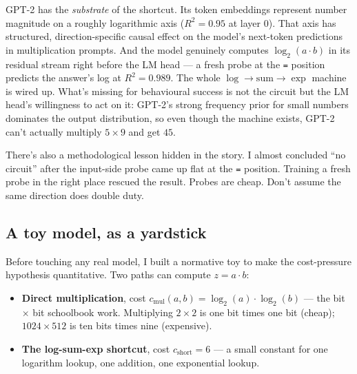 \documentclass[
]{article}
\providecommand{\tightlist}{%
  \setlength{\itemsep}{0pt}\setlength{\parskip}{0pt}}
\begin{document}
\begin{tcolorbox}[enhanced jigsaw, arc=.35mm, bottomrule=.15mm, bottomtitle=1mm, breakable, colback=white, colbacktitle=quarto-callout-note-color!10!white, colframe=quarto-callout-note-color-frame, coltitle=black, left=2mm, leftrule=.75mm, opacityback=0, opacitybacktitle=0.6, rightrule=.15mm, title=\textcolor{quarto-callout-note-color}{\faInfo}\hspace{0.5em}{Summary}, titlerule=0mm, toprule=.15mm, toptitle=1mm]

GPT-2 has the \emph{substrate} of the shortcut. Its token embeddings
represent number magnitude on a roughly logarithmic axis (\(R^2 = 0.95\)
at layer 0). That axis has structured, direction-specific causal effect
on the model's next-token predictions in multiplication prompts. And the
model genuinely computes \(\log_2(a \cdot b)\) in its residual stream
right before the LM head --- a fresh probe at the \texttt{=} position
predicts the answer's log at \(R^2 = 0.989\). The whole
\(\log \to \mathrm{sum} \to \exp\) machine is wired up. What's missing
for behavioural success is not the circuit but the LM head's willingness
to act on it: GPT-2's strong frequency prior for small numbers dominates
the output distribution, so even though the machine exists, GPT-2 can't
actually multiply \(5 \times 9\) and get \(45\).

\end{tcolorbox}

There's also a methodological lesson hidden in the story. I almost
concluded ``no circuit'' after the input-side probe came up flat at the
\texttt{=} position. Training a fresh probe in the right place rescued
the result. Probes are cheap. Don't assume the same direction does
double duty.

\subsection{A toy model, as a yardstick}\label{sec-toy-model}

Before touching any real model, I built a normative toy to make the
cost-pressure hypothesis quantitative. Two paths can compute
\(z = a \cdot b\):

\begin{itemize}
\tightlist
\item
  \textbf{Direct multiplication}, cost
  \(c_{\mathrm{mul}}(a, b) = \log_2(a) \cdot \log_2(b)\) --- the bit
  \(\times\) bit schoolbook work. Multiplying \(2 \times 2\) is one bit
  times one bit (cheap); \(1024 \times 512\) is ten bits times nine
  (expensive).
\item
  \textbf{The log-sum-exp shortcut}, cost \(c_{\mathrm{short}} = 6\) ---
  a small constant for one logarithm lookup, one addition, one
  exponential lookup.
\end{itemize}
\end{document}
